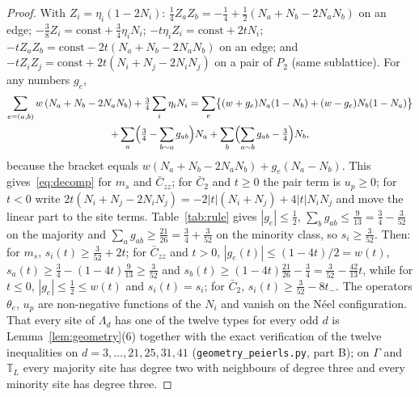 \documentclass[aps,prx,onecolumn,10pt,nofootinbib,longbibliography,floatfix]{revtex4-2}
\theoremstyle{remark}
\newcommand{\ms}{m_s}
\newcommand{\Czz}{\bar C_{zz}}
\newcommand{\Ctwo}{\bar C_{2}}
\begin{document}
\begin{proof}
With $Z_i=\eta_i(1-2N_i)$: $\frac14Z_aZ_b=-\frac14+\frac12(N_a+N_b-2N_aN_b)$ on an edge;
$-\frac38Z_i=\mathrm{const}+\frac34\eta_iN_i$; $-t\eta_iZ_i=\mathrm{const}+2tN_i$;
$-tZ_aZ_b=\mathrm{const}-2t(N_a+N_b-2N_aN_b)$ on an edge; and
$-tZ_iZ_j=\mathrm{const}+2t(N_i+N_j-2N_iN_j)$ on a pair of $P_2$ (same sublattice). For any numbers $g_e$,
\begin{multline*}
\sum_{e=(a,b)}w\,(N_a+N_b-2N_aN_b)+\tfrac34\sum_i\eta_iN_i %
=\sum_e\bigl\{(w+g_e)N_a(1-N_b)+(w-g_e)N_b(1-N_a)\bigr\}\\ %
+\sum_a\Bigl(\tfrac34-\sum_{b\sim a}g_{ab}\Bigr)N_a+\sum_b\Bigl(\sum_{a\sim b}g_{ab}-\tfrac34\Bigr)N_b , %
\end{multline*}
because the bracket equals $w(N_a+N_b-2N_aN_b)+g_e(N_a-N_b)$. This gives~\eqref{eq:decomp} for $\ms$ and
$\Czz$; for $\Ctwo$ and $t\ge0$ the pair term is $u_p\ge0$; for $t<0$ write
$2t(N_i+N_j-2N_iN_j)=-2|t|(N_i+N_j)+4|t|N_iN_j$ and move the linear part to the site terms. Table~\ref{tab:rule} gives
$|g_e|\le\frac12$, $\sum_bg_{ab}\le\frac9{13}=\frac34-\frac3{52}$ on the majority and %
$\sum_ag_{ab}\ge\frac{21}{26}=\frac34+\frac3{52}$ on the minority class, so $s_i\ge\frac3{52}$. Then: for $\ms$, %
$s_i(t)\ge\frac3{52}+2t$; for $\Czz$ and $t>0$, $|g_e(t)|\le(1-4t)/2=w(t)$, %
$s_a(t)\ge\frac34-(1-4t)\frac9{13}\ge\frac3{52}$ and $s_b(t)\ge(1-4t)\frac{21}{26}-\frac34=\frac3{52}-\frac{42}{13}t$, %
while for $t\le0$, $|g_e|\le\frac12\le w(t)$ and $s_i(t)=s_i$; for $\Ctwo$, $s_i(t)\ge\frac3{52}-8t_-$. The %
operators $\theta_e$, $u_p$ are non-negative functions of the $N_i$ and vanish on the N\'eel configuration. That every site of
$\Lambda_d$ has one of the twelve types for every odd $d$ is Lemma~\ref{lem:geometry}(6) together with the exact %
verification of the twelve inequalities on $d=3,\dots,21,25,31,41$ (\texttt{geometry\_peierls.py}, part B); on %
$\Gamma$ and $\mathbb T_L$ every majority site has degree two with neighbours of degree three and every minority
site has degree three.
\end{proof}
\end{document}
